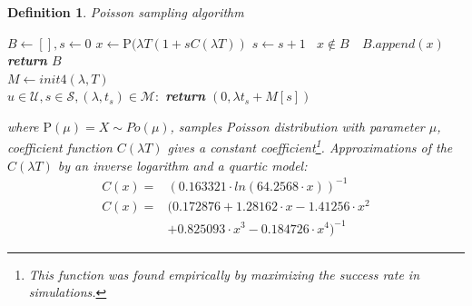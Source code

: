\documentclass{acm_proc_article-sp}
\newtheorem{mydef}{Definition}
\begin{document}
\begin{mydef}
Poisson sampling algorithm 


\begin{algorithmic}[1]
  \newcommand{\LineIf}[2]{ \State \algorithmicif\ {#1}\ \algorithmicthen\ {#2}}%
    \State $B\gets [], s \gets 0$
      \State $x\gets \text{P}(\lambda T (1+s C(\lambda T))$
      \State $s\gets s+1$
      \LineIf{$x \notin B$}{$B.append(x)$} %
    \EndWhile
    \State \textbf{return} $B$
   \EndFunction\\
    
   \State $M\gets init4(\lambda,T)$\\
   \State $u \in \mathcal{U}, s \in \mathcal{S}, (\lambda, t_s) \in \mathcal{M}:$
    \State \textbf{return} $(0, \lambda t_s + M[s])$
   \EndFunction
\end{algorithmic}
where $\text{P}(\mu) = X \sim Po(\mu)$, samples Poisson distribution with
parameter $\mu$, coefficient function $C(\lambda T)$ gives a constant 
coefficient\footnote{This function was found empirically by maximizing the success rate in simulations.}.
Approximations of the $C(\lambda T)$ by an inverse logarithm and a quartic model:
\begin{align*}
C(x) = & ({0.163321 \cdot  ln(64.2568 \cdot x)})^{-1}\\
C(x) = & (0.172876+1.28162\cdot x-1.41256\cdot x^2 \\
       & +0.825093\cdot x^3-0.184726\cdot x^4)^{-1}
\end{align*}
\end{mydef}
\end{document}
